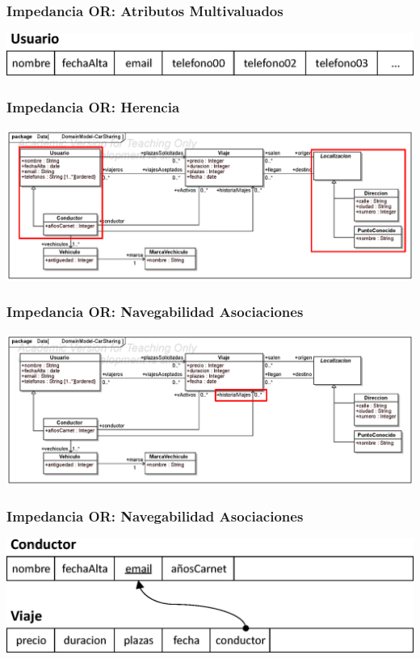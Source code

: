 \documentclass[a4paper,slidestop,xcolor=pst,dvips,blue]{beamer}
\begin{document}
\begin{frame}[c]
    \frametitle{Impedancia OR: Atributos Multivaluados}
    \begin{center}
        \includegraphics[width=0.8\linewidth]{images/persistencia/ooMismatch/ooMismatch03.eps}
    \end{center}
\end{frame}

\begin{frame}[c]
    \frametitle{Impedancia OR: Herencia}
    \begin{center}
        \includegraphics[width=\linewidth]{images/persistencia/ooMismatch/ooMismatch04.eps}
    \end{center}
\end{frame}

\begin{frame}[c]
    \frametitle{Impedancia OR: Navegabilidad Asociaciones}
    \begin{center}
        \includegraphics[width=\linewidth]{images/persistencia/ooMismatch/ooMismatch05.eps}
    \end{center}
\end{frame}

\begin{frame}[c]
    \frametitle{Impedancia OR: Navegabilidad Asociaciones}
    \begin{center}
        \includegraphics[width=0.8\linewidth]{images/persistencia/ooMismatch/ooMismatch06.eps}
    \end{center}
\end{frame}
\end{document}
